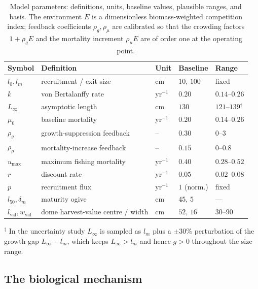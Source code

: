 \documentclass[pdflatex,sn-mathphys-num]{sn-jnl}
\theoremstyle{plain}
\theoremstyle{definition}
\theoremstyle{remark}
\begin{document}
\begin{table}[t]
\centering
\small
\caption{Model parameters: definitions, units, baseline values, plausible ranges,
and basis. The environment $E$ is a dimensionless biomass-weighted competition
index; feedback coefficients $\rho_g,\rho_\mu$ are calibrated so that the
crowding factors $1+\rho_gE$ and the mortality increment $\rho_\mu E$ are of
order one at the operating point.}
\label{tab:params}
\begin{tabular}{lllll}
\toprule
Symbol & Definition & Unit & Baseline & Range \\
\midrule
$l_0,l_m$ & recruitment / exit size & cm & $10,\,100$ & fixed \\
$k$ & von Bertalanffy rate & yr$^{-1}$ & $0.20$ & $0.14$--$0.26$ \\
$L_\infty$ & asymptotic length & cm & $130$ & $121$--$139$$^{\dagger}$ \\
$\mu_0$ & baseline mortality & yr$^{-1}$ & $0.20$ & $0.14$--$0.26$ \\
$\rho_g$ & growth-suppression feedback & -- & $0.30$ & $0$--$3$ \\
$\rho_\mu$ & mortality-increase feedback & -- & $0.15$ & $0$--$0.8$ \\
$u_{\max}$ & maximum fishing mortality & yr$^{-1}$ & $0.40$ & $0.28$--$0.52$ \\
$r$ & discount rate & yr$^{-1}$ & $0.05$ & $0.02$--$0.08$ \\
$p$ & recruitment flux & yr$^{-1}$ & $1$ (norm.) & fixed \\
$l_{50},\delta_m$ & maturity ogive & cm & $45,\,5$ & --- \\
$l_{\mathrm{val}},w_{\mathrm{val}}$ & dome harvest-value centre / width & cm & $52,\,16$ & $30$--$90$ \\
\bottomrule
\end{tabular}\vspace{2pt}
{\footnotesize $^{\dagger}$ In the uncertainty study $L_\infty$ is sampled as
$l_m$ plus a $\pm30\%$ perturbation of the growth gap $L_\infty-l_m$, which keeps
$L_\infty>l_m$ and hence $g>0$ throughout the size range.}
\end{table}

\subsection{The biological mechanism}
\label{subsec:bio_mechanism}
\end{document}
